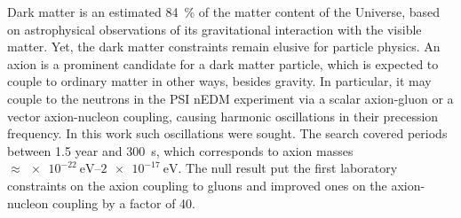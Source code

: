 Dark matter is an estimated \SI{84}{\percent} of the matter content of the Universe, based on astrophysical observations of its gravitational interaction with the visible matter.
Yet, the dark matter constraints remain elusive for particle physics.
An axion is a prominent candidate for a dark matter particle, which is expected to couple to ordinary matter in other ways, besides gravity.
In particular, it may couple to the neutrons in the PSI nEDM experiment via a scalar axion-gluon or a vector axion-nucleon coupling, causing harmonic oscillations in their precession frequency.
In this work such oscillations were sought.
The search covered periods between \num{1.5} year and \SI{300}{\second}, which corresponds to axion masses $\approx \SIrange[range-phrase=--]{e-22}{2e-17}{\electronvolt}$.
The null result put the first laboratory constraints on the axion coupling to gluons and improved ones on the axion-nucleon coupling by a factor of 40.

\enlargethispage{2\baselineskip}

\endgroup			

\vfill
